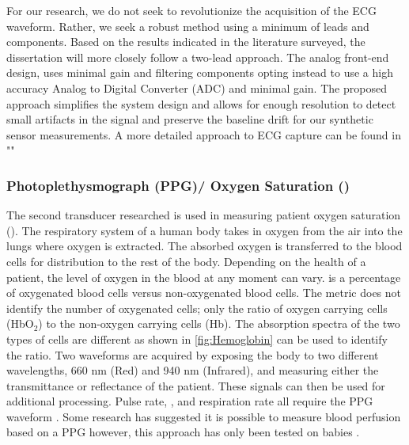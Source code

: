 For our research, we do not seek to revolutionize the acquisition of the ECG waveform. Rather, we seek a robust method using a minimum of leads and components. Based on the results indicated in the literature surveyed, the dissertation will more closely follow a two-lead approach. The analog front-end design, uses minimal gain and filtering components opting instead to use a high accuracy Analog to Digital Converter (ADC) and minimal gain. The proposed approach simplifies the system design and allows for enough resolution to detect small artifacts in the signal and preserve the baseline drift for our synthetic sensor measurements. A more detailed approach to ECG capture can be found in ""



\subsubsection[Photoplethysmograph(PPG)]{Photoplethysmograph (PPG)/ Oxygen Saturation ()}
\label{subsubsec:Photoplethysmograph}
The second transducer researched is used in measuring patient oxygen saturation (). The respiratory system of a human body takes in oxygen from the air into the lungs where oxygen is extracted. The absorbed oxygen is transferred to the blood cells for distribution to the rest of the body. Depending on the health of a patient, the level of oxygen in the blood at any moment can vary.  is a percentage of oxygenated blood cells versus non-oxygenated blood cells. The  metric does not identify the number of oxygenated cells; only the ratio of oxygen carrying cells (HbO$_2$) to the non-oxygen carrying cells (Hb). The absorption spectra of the two types of cells are different as shown in \cref{fig:Hemoglobin}\cite{Prahl1998} can be used to identify the ratio. Two waveforms are acquired by exposing the body to two different wavelengths, 660 nm (Red) and 940 nm (Infrared), and measuring either the transmittance or reflectance of the patient. These signals can then be used for additional processing. Pulse rate, , and respiration rate all require the PPG waveform \cite{Scully2012} \cite{Kraitl2011}.  Some research has suggested it is possible to measure blood perfusion based on a PPG however, this approach has only been tested on babies \cite{Noor2011}.


